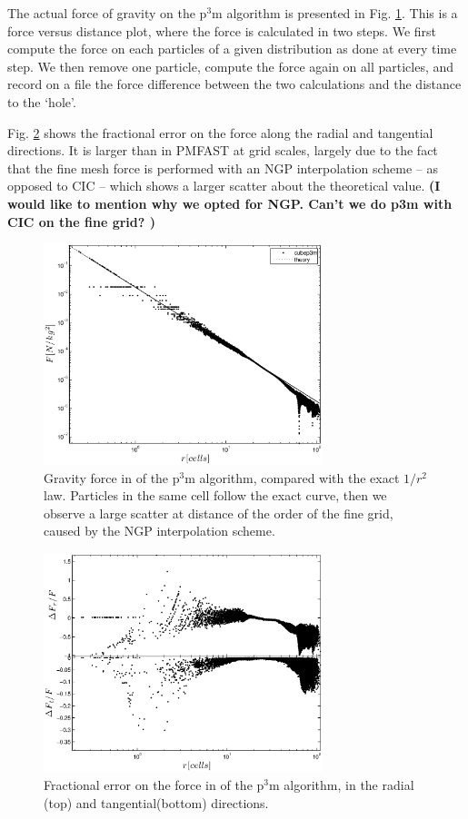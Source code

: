 The actual force of gravity on the p$^3$m algorithm is presented in Fig. \ref{fig:den_force_ppext0}.
This is a force versus distance plot, where the force is calculated in two steps. 
We first compute the force on each particles of a given distribution as done at every time step.
We then remove one particle, compute the force again on all particles, and record on a file the 
force difference between the two calculations and the distance to the `hole'.

Fig. \ref{fig:den_force_fracErr} shows the fractional error on the force along the radial and tangential directions.
It is larger than in {\small PMFAST} at grid scales, largely due to the fact that the fine mesh force is performed with an NGP interpolation scheme -- as opposed to CIC -- which shows a larger scatter about the theoretical value. {\bf (I would like to mention why we opted for NGP. Can't we do p3m with CIC on the fine grid? )}


\begin{figure}%
  \begin{center}
    \includegraphics[width=3.2in]{graphs/densityForce_ppext=0.eps}
  \caption{Gravity force in of the p$^3$m algorithm, compared with the exact $1/r^{2}$ law.
  Particles in the same cell follow the exact curve, then we observe a large scatter at 
  distance of the order of the fine grid, caused by the NGP interpolation scheme. 
    \label{fig:den_force_ppext0}}
\end{center}
\end{figure}

\begin{figure}%
  \begin{center}
    \includegraphics[width=3.2in]{graphs/densityForce_fracErr.eps}
  \caption{Fractional error on the force in of the p$^3$m algorithm, in the radial (top) and tangential(bottom) directions.
    \label{fig:den_force_fracErr}}
\end{center}
\end{figure}


